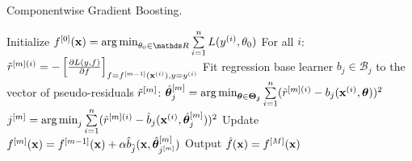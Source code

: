 
\begin{algorithm}[H]
  \begin{footnotesize}
  \begin{center}
  \caption{Componentwise Gradient Boosting.}
    \begin{algorithmic}[1]
      \State Initialize $\fm[0](\xv) = \argmin_{\theta_0\in\R} \sum  \limits_{i=1}^n L(\yi, \theta_0)$
        \State For all $i$: $\tilde{r}^{[m](i)} = -\left[\frac{\partial{L(y, f)}}{\partial f}\right]_{f=f^{[m-1]}(\mathbf{x}^{(i)}),y=y^{(i)}}$
          \State Fit regression base learner $b_j \in \mathcal{B}_j$ to the vector of pseudo-residuals $\tilde{r}^{[m]}$:
          \State $\hat{\bm{\theta}}^{[m]}_j = \operatorname{arg\,min}_{\bm{\theta} \in \bm{\Theta_j}} \sum  \limits_{i=1}^n
          (\tilde{r}^{[m](i)} - b_j(\mathbf{x}^{(i)}, \bm{\theta}))^2$
        \EndFor
        \State $j^{[m]} = \operatorname{arg\,min}_{j} \sum  \limits_{i=1}^n (\tilde{r}^{[m](i)} - \hat{b}_j(\mathbf{x}^{(i)}, \hat{\bm{\theta}}^{[m]}_j))^2$
        \State Update $f^{[m]}(\mathbf{x}) = f^{[m-1]}(\mathbf{x}) + \alpha \hat{b}_{\hat{j}}(\mathbf{x}, \hat{\bm{\theta}}^{[m]}_{j^{[m]}})$
      \EndFor
      \State Output $\hat{f}(\mathbf{x}) = f^{[M]}(\mathbf{x})$
    \end{algorithmic}
    \end{center}
    \end{footnotesize}
\end{algorithm}
